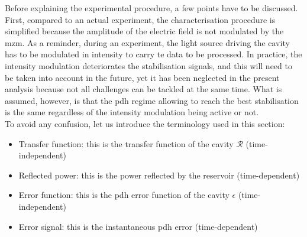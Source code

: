 Before explaining the experimental procedure, a few points have to be discussed. First, compared to an actual \rcer experiment, the characterisation procedure is simplified because the amplitude of the electric field is not modulated by the \gls{mzm}. As a reminder, during an \rcer experiment, the light source driving the cavity has to be modulated in intensity to carry te data to be processed. In practice, the intensity modulation deteriorates the stabilisation signals, and this will need to be taken into account in the future, yet it has been neglected in the present analysis because not all challenges can be tackled at the same time. What is assumed, however, is that the \gls{pdh} regime allowing to reach the best stabilisation is the same regardless of the intensity modulation being active or not.\\

To avoid any confusion, let us introduce the terminology used in this section:

\begin{itemize}
	\item Transfer function: this is the transfer function of the cavity $\mathcal{R}$ (time-independent)
	\item Reflected power: this is the power reflected by the reservoir (time-dependent)
	\item Error function: this is the \gls{pdh} error function of the cavity $\epsilon$ (time-independent)
	\item Error signal: this is the instantaneous \gls{pdh} error (time-dependent)
\end{itemize}


